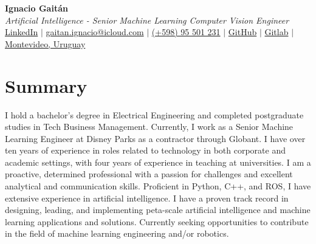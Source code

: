 \documentclass[letterpaper,11pt]{article}
\begin{document}
\begin{center}
    \textbf{\LARGE Ignacio Gaitán} \\ \vspace{2ex}
    \textit{Artificial Intelligence - Senior Machine Learning Computer Vision Engineer} \\ \vspace{2ex}
    \small
    \faLinkedinSquare \hspace{.5pt} \href{https://www.linkedin.com/in/ignacio-gaitan}{LinkedIn}
    $|$
    \faAt \hspace{.5pt} \href{mailto:gaitan.ignacio@icloud.com}{gaitan.ignacio@icloud.com}
    $|$
    \faMobile \hspace{.5pt} \href{tel:+59895501231}{(+598) 95 501 231}
    $|$
    \faGithub \hspace{.5pt} \href{https://github.com/gaitanignacio}{GitHub}
    $|$
    \faGithub \hspace{.5pt} \href{https://gitlab.com/gaitan.ignacio}{Gitlab}
    $|$
    \faMapMarker \hspace{.5pt} \href{https://www.google.com/maps/place/Prof.+Juan+Carlos+Sabat+Pebet+1234,+11300+Montevideo,+Departamento+de+Montevideo,+Uruguay/@-34.9044985,-56.1366609,17z/data=!3m1!4b1!4m6!3m5!1s0x959f813e56b3cedd:0x5a415e79543b2770!8m2!3d-34.9044985!4d-56.134086!16s%2Fg%2F11pysbccyt?entry=ttu}{Montevideo, Uruguay}
\end{center}

\vspace{-2ex}

\section*{Summary}
I hold a bachelor's degree in Electrical Engineering and completed postgraduate studies in Tech Business Management. 
Currently, I work as a Senior Machine Learning Engineer at Disney Parks as a contractor through Globant. 
I have over ten years of experience in roles related to technology in both corporate and academic settings, with four years of experience in teaching at universities. 
I am a proactive, determined professional with a passion for challenges and excellent analytical and communication skills. 
Proficient in Python, C++, and ROS, I have extensive experience in artificial intelligence. 
I have a proven track record in designing, leading, and implementing peta-scale artificial intelligence and machine learning applications and solutions. 
Currently seeking opportunities to contribute in the field of machine learning engineering and/or robotics.
\end{document}
